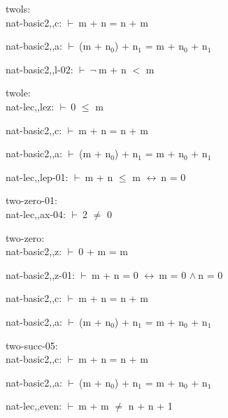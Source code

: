 \documentclass[a4paper]{article}
\newcommand{\Fol}{\mbox{$\vdash\ $}}
\newcommand{\Not}{\mbox{$\neg\ $}}
\newcommand{\And}{\mbox{$\wedge\ $}}
\newcommand{\Equiv}{\mbox{$\leftrightarrow\ $}}
\begin{document}
\bigskip

twols:\\ nat-basic2,,c: 
 \Fol m + n = n + m



nat-basic2,,a: 
 \Fol (m + $\mbox{n}_{0}$) + $\mbox{n}_{1}$ = m + $\mbox{n}_{0}$ + $\mbox{n}_{1}$



nat-basic2,,l-02: 
 \Fol \Not m + n $<$ m



\bigskip

twole:\\ nat-lec,,lez: 
 \Fol 0 $\le$ m



nat-basic2,,c: 
 \Fol m + n = n + m



nat-basic2,,a: 
 \Fol (m + $\mbox{n}_{0}$) + $\mbox{n}_{1}$ = m + $\mbox{n}_{0}$ + $\mbox{n}_{1}$



nat-lec,,lep-01: 
 \Fol m + n $\le$ m \Equiv n = 0



\bigskip

two-zero-01:\\ nat-lec,,ax-04: 
 \Fol 2 $\neq$ 0



\bigskip

two-zero:\\ nat-basic2,,z: 
 \Fol 0 + m = m



nat-basic2,,z-01: 
 \Fol m + n = 0 \Equiv m = 0 \And n = 0



nat-basic2,,c: 
 \Fol m + n = n + m



nat-basic2,,a: 
 \Fol (m + $\mbox{n}_{0}$) + $\mbox{n}_{1}$ = m + $\mbox{n}_{0}$ + $\mbox{n}_{1}$



\bigskip

two-succ-05:\\ nat-basic2,,c: 
 \Fol m + n = n + m



nat-basic2,,a: 
 \Fol (m + $\mbox{n}_{0}$) + $\mbox{n}_{1}$ = m + $\mbox{n}_{0}$ + $\mbox{n}_{1}$



nat-lec,,even: 
 \Fol m + m $\neq$ n + n + 1



\bigskip
\end{document}
